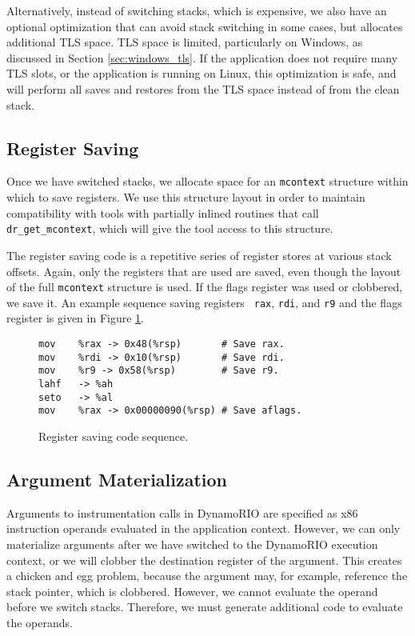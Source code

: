 Alternatively, instead of switching stacks, which is expensive, we also have an
optional optimization that can avoid stack switching in some cases, but
allocates additional TLS space.  TLS space is limited, particularly on Windows,
as discussed in Section \ref{sec:windows_tls}.  If the application does not
require many TLS slots, or the application is running on Linux, this
optimization is safe, and will perform all saves and restores from the TLS space
instead of from the clean stack.

\subsection{Register Saving}

Once we have switched stacks, we allocate space for an {\tt mcontext} structure
within which to save registers.  We use this structure layout in order to
maintain compatibility with tools with partially inlined routines that call {\tt
dr\_get\_mcontext}, which will give the tool access to this structure.

The register saving code is a repetitive series of register stores at various
stack offsets.  Again, only the registers that are used are saved, even though
the layout of the full {\tt mcontext} structure is used.  If the flags register
was used or clobbered, we save it.  An example sequence saving registers {\tt
rax}, {\tt rdi}, and {\tt r9} and the flags register is given in Figure
\ref{fig:reg_save}.

\begin{figure}
\begin{verbatim}
mov    %rax -> 0x48(%rsp)       # Save rax.
mov    %rdi -> 0x10(%rsp)       # Save rdi.
mov    %r9 -> 0x58(%rsp)        # Save r9.
lahf   -> %ah
seto   -> %al
mov    %rax -> 0x00000090(%rsp) # Save aflags.
\end{verbatim}
\caption{Register saving code sequence.}
\label{fig:reg_save}
\end{figure}

\subsection{Argument Materialization}

Arguments to instrumentation calls in DynamoRIO are specified as x86 instruction
operands evaluated in the application context.  However, we can only materialize
arguments after we have switched to the DynamoRIO execution context, or we will
clobber the destination register of the argument.  This creates a chicken and
egg problem, because the argument may, for example, reference the stack pointer,
which is clobbered.  However, we cannot evaluate the operand before we switch
stacks.  Therefore, we must generate additional code to evaluate the operands.

